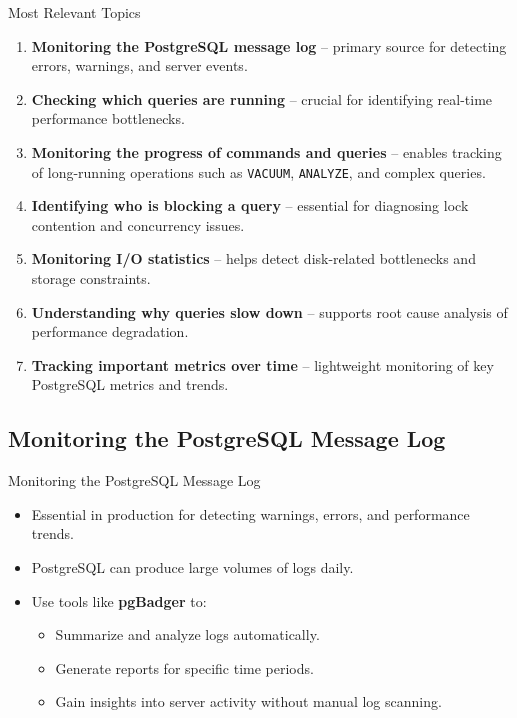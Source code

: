 \documentclass[aspectratio=169]{beamer}
\begin{document}
\begin{frame}{Most Relevant Topics}
    \begin{enumerate}
        \item \textbf{Monitoring the PostgreSQL message log} – primary source for detecting errors, warnings, and server events.

        \item \textbf{Checking which queries are running} – crucial for identifying real-time performance bottlenecks.

        \item \textbf{Monitoring the progress of commands and queries} – enables tracking of long-running operations such as \texttt{VACUUM}, \texttt{ANALYZE}, and complex queries.

        \item \textbf{Identifying who is blocking a query} – essential for diagnosing lock contention and concurrency issues.

        \item \textbf{Monitoring I/O statistics} – helps detect disk-related bottlenecks and storage constraints.

        \item \textbf{Understanding why queries slow down} – supports root cause analysis of performance degradation.

        \item \textbf{Tracking important metrics over time} – lightweight monitoring of key PostgreSQL metrics and trends.
    \end{enumerate}
\end{frame}


\subsection{Monitoring the PostgreSQL Message Log}

\begin{frame}{Monitoring the PostgreSQL Message Log}
\begin{itemize}
    \item Essential in production for detecting warnings, errors, and performance trends.
    \item PostgreSQL can produce large volumes of logs daily.
    \item Use tools like \textbf{pgBadger} to:
    \begin{itemize}
        \item Summarize and analyze logs automatically.
        \item Generate reports for specific time periods.
        \item Gain insights into server activity without manual log scanning.
    \end{itemize}
\end{itemize}
\end{frame}
\end{document}
